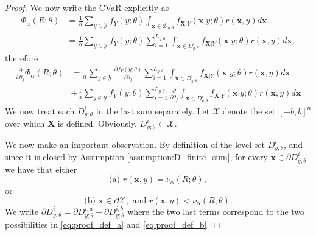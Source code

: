 \documentclass[letterpaper]{article}
\newcommand{\cvar}{\Phi_\alpha}
\newcommand{\var}{\nu_\alpha}
\newcommand{\cD}{\mathcal{D}}
\newcommand{\cX}{\mathcal{X}}
\newcommand{\cY}{\mathcal{Y}}
\newcommand{\bx}{\mathbf{x}}
\newcommand{\bX}{\mathbf{X}}
\newcommand{\Dth}{\frac{\partial}{\partial \theta_j}}
\newcommand{\Dt}[1]{\frac{\partial {#1}}{\partial \theta_j}}
\begin{document}
\begin{proof}
We now write the CVaR explicitly as
\begin{equation*}
\begin{split}
\cvar (R;\theta) &= \frac{1}{\alpha} \sum_{y\in \cY}f_Y(y;\theta)\int_{\bx \in \cD_{y;\theta}} f_{\bX|Y}(\bx|y;\theta) r(\bx,y) d\bx \\
 &= \frac{1}{\alpha} \sum_{y\in \cY}f_Y(y;\theta)\sum_{i=1}^{L_{y;\theta}}\int_{\bx \in D_{y;\theta}^i} f_{\bX|Y}(\bx|y;\theta) r(\bx,y) d\bx,
\end{split}
\end{equation*}
therefore
\begin{equation}\label{eq:proof_cvar_derivtive}
\begin{split}
\Dth \cvar (R;\theta) &= \frac{1}{\alpha} \sum_{y\in \cY}\Dt{f_Y(y;\theta)} \sum_{i=1}^{L_{y;\theta}}\int_{\bx \in D_{y;\theta}^i} f_{\bX|Y}(\bx|y;\theta) r(\bx,y) d\bx \\
&+ \frac{1}{\alpha} \sum_{y\in \cY}f_Y(y;\theta) \sum_{i=1}^{L_{y;\theta}} \Dth \int_{\bx \in D_{y;\theta}^i} f_{\bX|Y}(\bx|y;\theta) r(\bx,y) d\bx
\end{split}
\end{equation}
We now treat each $D_{y;\theta}^i$ in the last sum separately. Let $\cX$ denote the set $[-b,b]^n$ over which $\bX$ is defined. Obviously, $D_{y;\theta}^i \subset \cX$.

We now make an important observation. By definition of the level-set $D_{y;\theta}^i$, and since it is closed by Assumption \ref{assumption:D_finite_sum}, for every $\bx \in \partial D_{y;\theta}^i$ we have that either
\begin{equation}\label{eq:proof_def_a}
\textrm{(a) } r(\bx,y) = \var (R;\theta),
\end{equation}
or
\begin{equation}\label{eq:proof_def_b}
\textrm{(b) } \bx \in \partial \cX, \textrm{ and } r(\bx,y) < \var (R;\theta).
\end{equation}
We write $\partial D_{y;\theta}^i = \partial D_{y;\theta}^{i,a} + \partial D_{y;\theta}^{i,b}$ where the two last terms correspond to the two possibilities in \eqref{eq:proof_def_a} and \eqref{eq:proof_def_b}.


\end{proof}
\end{document}
